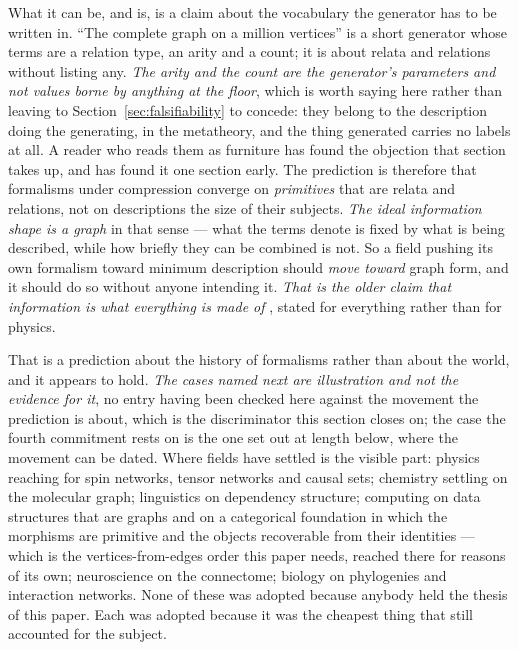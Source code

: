 \documentclass[11pt,a4paper]{article}
\begin{document}
What it can be, and is, is a claim about the vocabulary the generator has to be written in. ``The
complete graph on a million vertices'' is a short generator whose terms are a relation type, an arity
and a count; it is about relata and relations without listing any. \emph{The arity and the count are
the generator's parameters and not values borne by anything at the floor}, which is worth saying here
rather than leaving to Section~\ref{sec:falsifiability} to concede: they belong to the description
doing the generating, in the metatheory, and the thing generated carries no labels at all. A reader who
reads them as furniture has found the objection that section takes up, and has found it one section
early. The prediction is therefore that
formalisms under compression converge on \emph{primitives} that are relata and relations, not on
descriptions the size of their subjects. \emph{The ideal information shape is a graph} in that sense
--- what the terms denote is fixed by what is being described, while how briefly they can be combined
is not. So a field pushing its own formalism toward minimum description should \emph{move toward}
graph form, and it should do so without anyone intending it. \emph{That is the older claim that
information is what everything is made of} \citep{wheeler1990,bateson1972}, stated for everything rather
than for physics.

That is a prediction about the history of formalisms rather than about the world, and it appears to
hold. \emph{The cases named next are illustration and not the evidence for it}, no entry having been
checked here against the movement the prediction is about, which is the discriminator this section
closes on; the case the fourth commitment rests on is the one set out at length below, where the
movement can be dated. Where fields have settled is the visible part: physics reaching for spin
networks, tensor networks and causal sets; chemistry settling on the
molecular graph; linguistics on dependency structure; computing on data structures that are graphs and on a categorical foundation in which the morphisms
are primitive and the objects recoverable from their identities --- which is the vertices-from-edges
order this paper needs, reached there for reasons of its own; neuroscience on the connectome; biology on
phylogenies and interaction networks. None of these was adopted because anybody held the thesis of this
paper. Each was adopted because it was the cheapest thing that still accounted for the subject.
\end{document}
